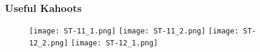 \documentclass[../ESOF_notes.tex]{subfiles}
\begin{document}
\subsubsection{Useful Kahoots}
\begin{figure}[h!]
    \texttt{[image: ST-11\_1.png]}
    \centering
    \texttt{[image: ST-11\_2.png]}
    \texttt{[image: ST-12\_2.png]}
    \centering
    \texttt{[image: ST-12\_1.png]}
\end{figure}
\end{document}
